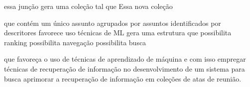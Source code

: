 


essa junção gera uma coleção tal que 
Essa nova coleção 

  que contém um único assunto 
  agrupados por assuntos 
  identificados por descritores
  favorece uso técnicas de ML
  gera uma estrutura que 
    possibilita ranking
	possibilita navegação
	possibilita busca
  


que favoreça o uso de técnicas de aprendizado de máquina e com isso empregar técnicas de recuperação de informação no desenvolvimento de um sistema para busca aprimorar a recuperação de informação em coleções de atas de reunião. 











